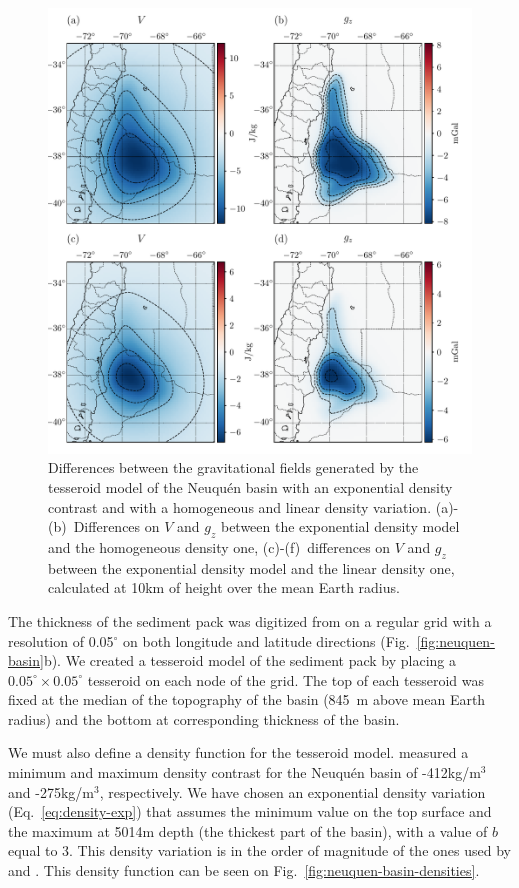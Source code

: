 \documentclass[extra, referee]{gji}
\begin{document}
\begin{figure}
\centering
\includegraphics[width=\linewidth]{figures/neuquen-basin-diffs.pdf}
\caption{
    Differences between the gravitational fields generated by the tesseroid model of the
    Neuqu\'en basin with an exponential density contrast and with a homogeneous and
    linear density variation.
    \mbox{(a)-(b)}~Differences on $V$ and $g_z$ between the exponential density model
    and the homogeneous density one,
    \mbox{(c)-(f)}~differences on $V$ and $g_z$ between the exponential density model
    and the linear density one, calculated at 10km of height over the mean Earth radius.
}
\label{fig:neuquen-basin-diffs}
\end{figure}

The thickness of the sediment pack was digitized from \citet{Heine2007} on a regular
grid with a resolution of 0.05$^\circ$ on both longitude and latitude directions
(Fig.~\ref{fig:neuquen-basin}b).
We created a tesseroid model of the sediment pack by placing a
$0.05^\circ \times 0.05^\circ$ tesseroid on each node of the grid.
The top of each tesseroid was fixed at the median of the topography of the basin
(845~m above mean Earth radius) and the bottom at corresponding thickness of the basin.

We must also define a density function for the tesseroid model.
\citet{Sigismondi2012} measured a minimum and maximum density contrast for
the Neuqu\'en basin of -412kg/m$^3$ and -275kg/m$^3$, respectively.
We have chosen an exponential density variation (Eq.~\ref{eq:density-exp}) that assumes
the minimum value on the top surface and the maximum at 5014m depth (the thickest part
of the basin), with a value of $b$ equal to 3.
This density variation is in the order of magnitude of the ones used by
\citet{Cowie1990} and \citet{Cordell1973}.
This density function can be seen on Fig.~\ref{fig:neuquen-basin-densities}.
\end{document}
